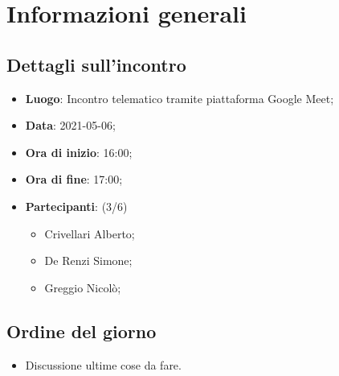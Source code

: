\section{Informazioni generali}

\subsection{Dettagli sull'incontro}
\begin{itemize}
\item \textbf{Luogo}: Incontro telematico tramite piattaforma Google Meet;
\item \textbf{Data}: 2021-05-06;
\item \textbf{Ora di inizio}: 16:00;
\item \textbf{Ora di fine}: 17:00;
\item \textbf{Partecipanti}: (3/6) 
\begin{itemize}

	\item Crivellari Alberto;
	\item De Renzi Simone;
	\item Greggio Nicolò;
	

\end{itemize}
\end{itemize}

\subsection{Ordine del giorno}
\begin{itemize}
	\item Discussione ultime cose da fare.
\end{itemize}


